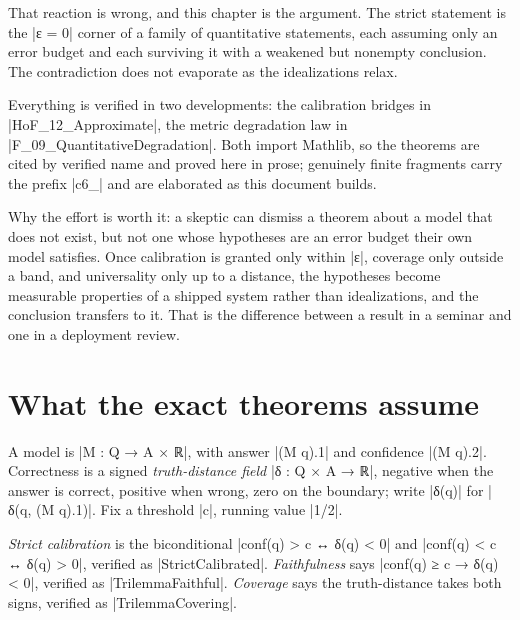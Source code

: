 \documentclass{memoir}
\begin{document}
That reaction is wrong, and this chapter is the argument. The strict statement
is the \LeanVerb|ε = 0| corner of a family of quantitative statements, each assuming only
an error budget and each surviving it with a weakened but nonempty conclusion.
The contradiction does not evaporate as the idealizations relax.

Everything is verified in two developments: the calibration bridges in
\LeanVerb|HoF_12_Approximate|, the metric degradation law in
\LeanVerb|F_09_QuantitativeDegradation|. Both import Mathlib, so the theorems are cited
by verified name and proved here in prose; genuinely finite fragments carry the
prefix \LeanVerb|c6_| and are elaborated as this document builds.

Why the effort is worth it: a skeptic can dismiss a theorem about a model that
does not exist, but not one whose hypotheses are an error budget their own model
satisfies. Once calibration is granted only within \LeanVerb|ε|, coverage only outside a
band, and universality only up to a distance, the hypotheses become measurable
properties of a shipped system rather than idealizations, and the conclusion
transfers to it. That is the difference between a result in a seminar and one in
a deployment review.



\section{What the exact theorems assume}\label{Two--Schemas--of--Impossibility-005F-005F-005F--Machine--Checked--Limits--of--Trustworthy--Machine--Learning-005F-005F-005F--and--Why--They--Tighten--with--Capability----Approximate--Bridges--to--Real--Models----What--the--exact--theorems--assume}

A model is \LeanVerb|M : Q → A × ℝ|, with answer \LeanVerb|(M q).1| and confidence \LeanVerb|(M q).2|.
Correctness is a signed \emph{truth-distance field} \LeanVerb|δ : Q × A → ℝ|, negative when
the answer is correct, positive when wrong, zero on the boundary; write \LeanVerb|δ(q)|
for \LeanVerb|δ(q, (M q).1)|. Fix a threshold \LeanVerb|c|, running value \LeanVerb|1/2|.

\emph{Strict calibration} is the biconditional \LeanVerb|conf(q) > c ↔ δ(q) < 0| and \LeanVerb|conf(q) < c ↔ δ(q) > 0|,
verified as \LeanVerb|StrictCalibrated|. \emph{Faithfulness} says \LeanVerb|conf(q) ≥ c → δ(q) < 0|,
verified as \LeanVerb|TrilemmaFaithful|. \emph{Coverage} says the truth-distance takes both
signs, verified as \LeanVerb|TrilemmaCovering|.
\end{document}
